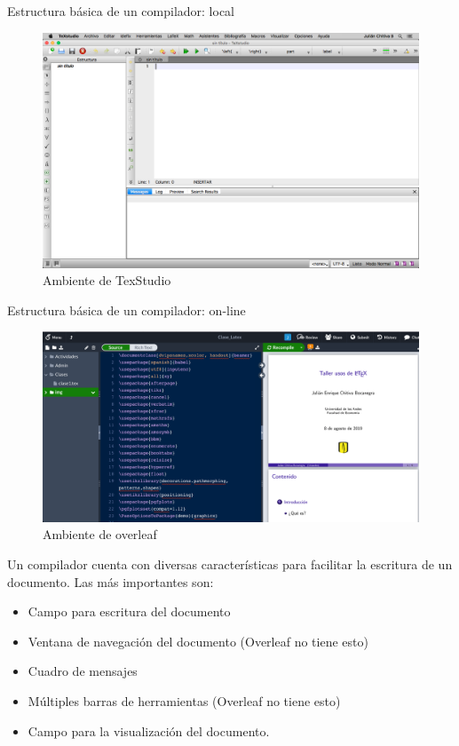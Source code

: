 \documentclass[dvipsnames,xcolor, handout]{beamer}
\theoremstyle{plain}
\theoremstyle{definition}
\begin{document}
\begin{frame}{Estructura básica de un compilador: local}
    \begin{figure}
        \centering
        \includegraphics[width=\linewidth]{img/clase1_texstudio.png}
        \caption{Ambiente de TexStudio}
        \label{fig:texstudio}
    \end{figure}
\end{frame}

\begin{frame}{Estructura básica de un compilador: on-line}
    \begin{figure}
        \centering
        \includegraphics[width=\linewidth]{img/clase1_overleaf.png}
        \caption{Ambiente de overleaf}
        \label{fig:texstudio}
    \end{figure}
\end{frame}
\begin{frame}
    Un compilador cuenta con diversas características para facilitar la escritura de un documento. Las más importantes son:
    \begin{itemize}
        \item Campo para escritura del documento 
        \item Ventana de navegación del documento (Overleaf no tiene esto)
        \item Cuadro de mensajes
        \item Múltiples barras de herramientas (Overleaf no tiene esto)
        \item Campo para la visualización del documento.
    \end{itemize}
\end{frame}
\end{document}

